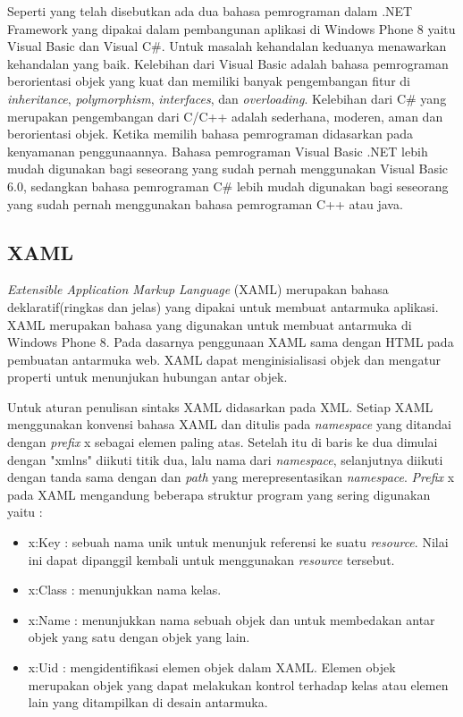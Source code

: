 Seperti yang telah disebutkan ada dua bahasa pemrograman dalam .NET Framework yang dipakai dalam pembangunan aplikasi di Windows Phone 8 yaitu Visual Basic dan Visual C\#. Untuk masalah kehandalan keduanya menawarkan kehandalan yang baik. Kelebihan dari Visual Basic adalah bahasa pemrograman berorientasi objek yang kuat dan memiliki banyak pengembangan fitur di \textit{inheritance}, \textit{polymorphism}, \textit{interfaces}, dan \textit{overloading}\cite{MSDN}. Kelebihan dari C\# yang merupakan pengembangan dari C/C++ adalah sederhana, moderen, aman dan berorientasi objek\cite{MSDN}. Ketika memilih bahasa pemrograman didasarkan pada kenyamanan penggunaannya. Bahasa pemrograman Visual Basic .NET lebih mudah digunakan bagi seseorang yang sudah pernah menggunakan Visual Basic 6.0, sedangkan bahasa pemrograman C\# lebih mudah digunakan bagi seseorang yang sudah pernah menggunakan bahasa pemrograman C++ atau java.

\subsection{XAML \cite{MSDN}}
\label{subsec:XAML}
\hspace{0.5cm} \textit{Extensible Application Markup Language} (XAML) merupakan bahasa deklaratif(ringkas dan jelas) yang dipakai untuk membuat antarmuka aplikasi. XAML merupakan bahasa yang digunakan untuk membuat antarmuka di Windows Phone 8\cite{Manning}. Pada dasarnya penggunaan XAML sama dengan HTML pada pembuatan antarmuka web. XAML dapat menginisialisasi objek dan mengatur properti untuk menunjukan hubungan antar objek.

Untuk aturan penulisan sintaks XAML didasarkan pada XML. Setiap XAML menggunakan konvensi bahasa XAML dan ditulis pada \textit{namespace} yang ditandai dengan \textit{prefix} x sebagai elemen paling atas. Setelah itu di baris ke dua dimulai dengan "xmlns" diikuti titik dua, lalu nama dari \textit{namespace}, selanjutnya diikuti dengan tanda sama dengan dan \textit{path} yang merepresentasikan \textit{namespace}\cite{Manning}.
\textit{Prefix} x pada XAML mengandung beberapa struktur program yang sering digunakan yaitu :
\begin{itemize}
	\item x:Key : sebuah nama unik untuk menunjuk referensi ke suatu \textit{resource}. Nilai ini dapat dipanggil kembali untuk menggunakan \textit{resource} tersebut.
	\item x:Class : menunjukkan nama kelas.
	\item x:Name : menunjukkan nama sebuah objek dan untuk membedakan antar objek yang satu dengan objek yang lain.
	\item x:Uid : mengidentifikasi elemen objek dalam XAML. Elemen objek merupakan objek yang dapat melakukan kontrol terhadap kelas atau elemen lain yang ditampilkan di desain antarmuka.
\end{itemize}	

